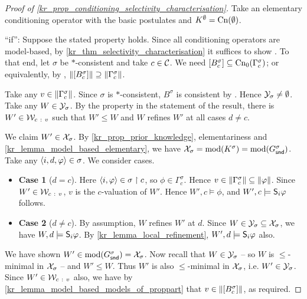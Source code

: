 \begin{proof}[Proof of \cref{kr_prop_conditioning_selectivity_characterisation}]
    Take an elementary conditioning operator with the basic postulates
    and $K^\emptyset = \cn(\emptyset)$.

    ``if'':  Suppose the stated property holds. Since all conditioning operators
    are model-based, by \cref{kr_thm_selectivity_characterisation} it suffices to
    show \boundedness{}. To that end, let $\sigma$ be $\ast$-consistent and
    take $c \in \C$. We need $\proppart{B^\sigma_c} \subseteq
    \cnprop(\Gamma^\sigma_c)$; or equivalently, by \closure{},
    $\propmods{\proppart{B^\sigma_c}} \supseteq \propmods{\Gamma^\sigma_c}$.

    Take any $v \in \propmods{\Gamma^\sigma_c}$. Since $\sigma$ is
    $\ast$-consistent, $B^\sigma$ is consistent by \consistency{}. Hence
    $\Y_\sigma \ne \emptyset$. Take any $W \in \Y_\sigma$. By the property in
    the statement of the result, there is $W' \in \W_{c\ :\ v}$ such that $W'
    \le W$ and $W$ refines $W'$ at all cases $d \ne c$.

    We claim $W' \in \X_\sigma$. By \cref{kr_prop_prior_knowledge}, elementariness
    and \cref{kr_lemma_model_based_elementary}, we have $\X_\sigma =
    \mods(K^\sigma) = \mods(G^\sigma_\snd)$. Take any $\tuple{i, d, \phi} \in
    \sigma$. We consider cases.
    \begin{itemize}
        \item \textbf{Case 1} ($d = c$). Here $\tuple{i, \phi} \in \sigma \rs
            c$, so $\phi \in \Gamma^\sigma_c$. Hence $v \in
            \propmods{\Gamma^\sigma_c} \subseteq \propmods{\phi}$. Since $W'
            \in \W_{c\ :\ v}$, $v$ is the $c$-valuation of $W'$. Hence $W', c
            \models \phi$, and $W', c \models \S_i\phi$ follows.

        \item \textbf{Case 2} ($d \ne c$). By assumption, $W$ refines $W'$ at
              $d$. Since $W \in \Y_\sigma \subseteq \X_\sigma$, we have $W, d
              \models \S_i\phi$. By \cref{kr_lemma_local_refinement}, $W', d
              \models \S_i\phi$ also.
    \end{itemize}
    We have shown $W' \in \mods(G^\sigma_\snd) = \X_\sigma$. Now recall that $W
    \in \Y_\sigma$ -- so $W$ is $\le$-minimal in $\X_\sigma$ -- and $W' \le W$.
    Thus $W'$ is also $\le$-minimal in $\X_\sigma$, i.e. $W' \in \Y_\sigma$.
    Since $W' \in \W_{c\ :\ v}$ also, we have by
    \cref{kr_lemma_model_based_models_of_proppart} that $v \in
    \propmods{\proppart{B^\sigma_c}}$, as required.


\end{proof}
